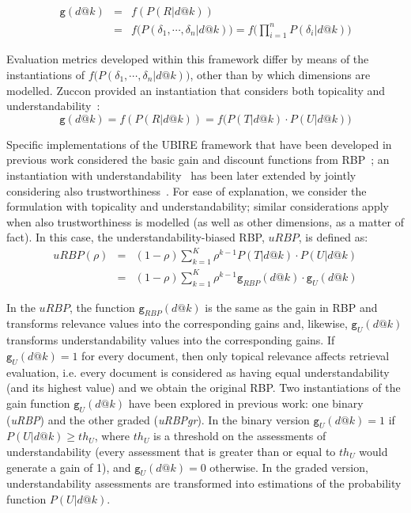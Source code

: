 \begin{eqnarray*}
    \mathtt{g}(d@k) &=& f(P(R|d@k)) \\
    &=& f\big(P(\delta_1, \cdots, \delta_n|d@k)\big) = f\Big(\prod_{i=1}^n P(\delta_i|d@k)\Big) 
\end{eqnarray*}


Evaluation metrics developed within this framework differ by means of the instantiations of $f\big(P(\delta_1, \cdots, \delta_n|d@k)\big)$, other than by which dimensions are modelled. Zuccon provided an instantiation that considers both topicality and understandability~\cite{zuccon16}:
%
\begin{equation*}
\mathtt{g}(d@k) = f(P(R|d@k)) = f\big(P(T|d@k) \cdot P(U|d@k)\big)
\end{equation*}

Specific implementations of the UBIRE framework that have been developed in previous work considered the basic gain and discount functions from RBP~\cite{moffat08}; an instantiation with understandability~\cite{zuccon14,zuccon16} has been later extended by jointly considering also trustworthiness~\cite{clefIR17}. For ease of explanation, we consider the formulation with topicality and understandability; similar considerations apply when also trustworthiness is modelled (as well as other dimensions, as a matter of fact). In this case, the understandability-biased RBP, $uRBP$, is defined as: 
%
\begin{eqnarray*}
    uRBP(\rho) &=& (1-\rho) \sum_{k=1}^{K} \rho^{k-1} P(T|d@k) \cdot P(U|d@k)\\ 
&=& (1-\rho) \sum_{k=1}^{K} \rho^{k-1} \mathtt{g}_{RBP}(d@k) \cdot \mathtt{g}_{U}(d@k)
\label{eq:RBP}
\end{eqnarray*}

In the $uRBP$, the function $\mathtt{g}_{RBP}(d@k)$ is the same as the gain in RBP and transforms relevance values into the corresponding gains and, likewise, $\mathtt{g}_{U}(d@k)$ transforms understandability values into the corresponding gains. 
If $\mathtt{g}_{U}(d@k)=1$ for every document, then only topical relevance affects retrieval evaluation, i.e. every document is considered as having equal understandability (and its highest value) and we obtain the original RBP. Two instantiations of the gain function $\mathtt{g}_{U}(d@k)$ have been explored in previous work: one binary (\textit{uRBP}) and the other graded (\textit{uRBPgr}). In the binary version $\mathtt{g}_{U}(d@k) = 1$ if $P(U|d@k) \geq th_U$, where $th_U$ is a threshold on the assessments of understandability (every assessment that is greater than or equal to $th_U$ would generate a gain of 1), and $\mathtt{g}_{U}(d@k)=0$ otherwise. In the graded version, understandability assessments are transformed into estimations of the probability function $P(U|d@k)$.

